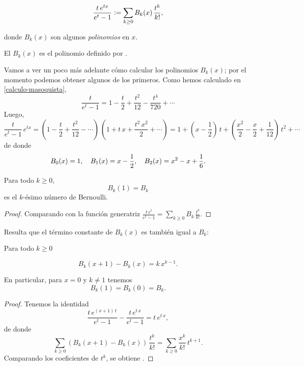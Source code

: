 \documentclass{article}
\numberwithin{equation}{section}
\theoremstyle{definition}
\begin{document}
\begin{equation}
  \label{polinomios-de-Bernoulli-por-una-funcion-generatriz}
  \frac{t\,e^{tx}}{e^t-1} \mathrel{\mathop:}= \sum_{k \ge 0} B_k (x)\,\frac{t^k}{k!},
\end{equation}

\noindent donde $B_k (x)$ son algunos \emph{polinomios} en $x$.

\begin{definicion}
  El  $B_k (x)$ es el polinomio definido por
  .
\end{definicion}

\begin{ejemplo}
  Vamos a ver un poco más adelante cómo calcular los polinomios $B_k (x)$; por
  el momento podemos obtener algunos de los primeros. Como hemos calculado en
  \ref{calculo-masoquista},
  $$\frac{t}{e^t - 1} = 1 - \frac{t}{2} + \frac{t^2}{12} - \frac{t^4}{720} + \cdots$$
  Luego,
  $$\frac{t}{e^t - 1} \, e^{tx} =
  \left(1 - \frac{t}{2} + \frac{t^2}{12} - \cdots\right) \, \left(1 + t\,x + \frac{t^2\,x^2}{2} + \cdots\right) =
  1 + \left(x - \frac{1}{2}\right)\,t + \left(\frac{x^2}{2} - \frac{x}{2} + \frac{1}{12}\right)\,t^2 + \cdots$$
  de donde
  \[ B_0 (x) = 1, \quad
    B_1 (x) = x - \frac{1}{2}, \quad
    B_2 (x) = x^2 - x + \frac{1}{6}. \qedhere \]
\end{ejemplo}

\begin{observacion}
  Para todo $k\ge 0$,
  $$B_k (1) = B_k$$
  es el $k$-ésimo número de Bernoulli.

  \begin{proof}
    Comparando  con la
    función generatriz
    $\frac{t\,e^t}{e^t-1} = \sum_{k \ge 0} B_k\,\frac{t^k}{k!}$.
  \end{proof}
\end{observacion}

Resulta que el término constante de $B_k (x)$ es también igual a $B_k$:

\begin{observacion}
  Para todo $k \ge 0$

  \begin{equation}
    \label{Bk(x+1)-y-Bk(x)}
    B_k (x+1) - B_k (x) = k\,x^{k-1}.
  \end{equation}

  En particular, para $x = 0$ y $k \ne 1$ tenemos
  $$B_k (1) = B_k (0) = B_k.$$

  \begin{proof}
    Tenemos la identidad
    $$\frac{t\,e^{(x+1)\,t}}{e^t-1} - \frac{t\,e^{t\,x}}{e^t-1} = t\,e^{t\,x},$$
    de donde
    $$\sum_{k\ge 0} (B_k (x+1) - B_k (x))\,\frac{t^k}{k!} =
    \sum_{k \ge 0} \frac{x^k}{k!}\,t^{k+1}.$$
    Comparando los coeficientes de $t^k$, se obtiene .
  \end{proof}
\end{observacion}
\end{document}
